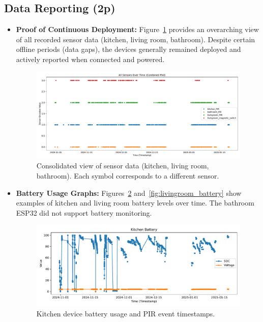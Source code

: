 \documentclass[A4,10pt]{article}
\begin{document}
 
\subsection{Data Reporting (2p)}
\label{sec:data_reporting}

\begin{itemize}
    \item \textbf{Proof of Continuous Deployment:}
    Figure~\ref{fig:all_sensors_data} provides an overarching view of all recorded sensor data (kitchen, living room, bathroom). Despite certain offline periods (data gaps), the devices generally remained deployed and actively reported when connected and powered.

\begin{figure}[H]
    \centering
    \includegraphics[width=1.15\textwidth]{all_sensors_data.pdf}
    \caption{Consolidated view of sensor data (kitchen, living room, bathroom). Each symbol corresponds to a different sensor.}
    \label{fig:all_sensors_data}
\end{figure}

    \item \textbf{Battery Usage Graphs:}
    Figures~\ref{fig:kitchen_battery} and~\ref{fig:livingroom_battery} show examples of kitchen and living room battery levels over time. The bathroom ESP32 did not support battery monitoring.

    \begin{figure}[H]
        \centering
        \includegraphics[width=1.15\textwidth]{kitchen_battery.pdf}
        \caption{Kitchen device battery usage and PIR event timestamps.}
        \label{fig:kitchen_battery}
    \end{figure}


\end{itemize}
\end{document}
